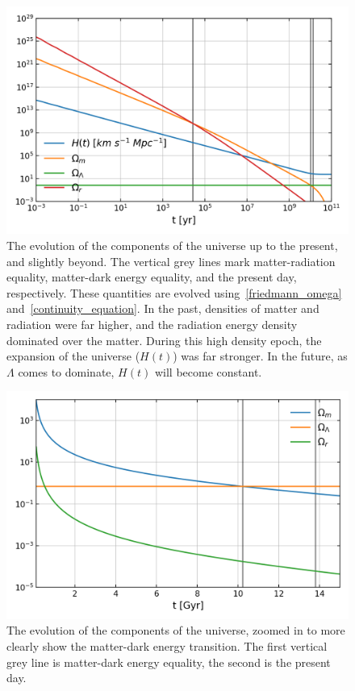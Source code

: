 \begin{figure}[hp!]
\centering     %
    \includegraphics[width=.75\columnwidth]{plots/lcdm_components.png}
\caption{
    The evolution of the components of the universe up to the present, and slightly beyond.
    The vertical grey lines mark matter-radiation equality, matter-dark energy equality,
    and the present day, respectively.
    These quantities are evolved using~\eqref{friedmann_omega} and~\eqref{continuity_equation}.
    In the past, densities of matter and radiation were
    far higher, and the radiation energy density dominated over the matter.
    During this high density epoch, the expansion of the universe ($H(t)$) was far stronger.
    In the future, as $\Lambda$ comes to dominate, $H(t)$ will become constant.
}\label{fig:lcdm_components}
\end{figure}
\begin{figure}[hp!]
\centering     %
    \includegraphics[width=.75\columnwidth]{plots/lcdm_components_linear.png}
\caption{
    The evolution of the components of the universe, zoomed in to more clearly
    show the matter-dark energy transition. The first vertical grey line is
    matter-dark energy equality, the second is the present day.
}\label{fig:lcdm_components_linear}
\end{figure}

